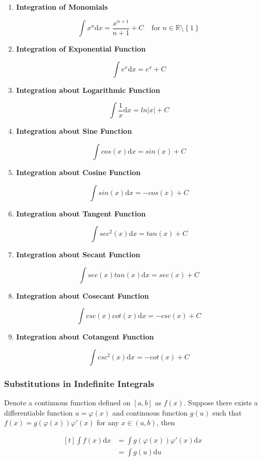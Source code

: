 \documentclass[a4paper,12pt]{article}
\newcommand{\R}{\mathbb{R}}
\newcommand{\diff}{\mathrm{d}}
\newenvironment{alist}{ %
\begin{enumerate}[label=(\alph*)]
}{
\end{enumerate}
}
\begin{document}
\begin{alist}
  \item \textbf{Integration of Monomials}

  $$\int x^{n}\diff x=\frac{x^{n+1}}{n+1}+C\;\;\;\;\text{for }n\in\R\setminus\left\{ 1\right\}$$

  \item \textbf{Integration of Exponential Function}

  $$\int e^{x}\diff x=e^{x}+C$$

  \item \textbf{Integration about Logarithmic Function}

  $$\int\frac{1}{x}\diff x=ln\left| x\right| +C$$

  \item \textbf{Integration about Sine Function}

  $$\int cos(x)\diff x=sin(x)+C$$

  \item \textbf{Integration about Cosine Function}

  $$\int sin(x)\diff x=-cos(x)+C$$

  \item \textbf{Integration about Tangent Function}

  $$\int sec^{2}(x)\diff x=tan(x)+C$$

  \item \textbf{Integration about Secant Function}

  $$\int sec(x)tan(x)\diff x=sec(x)+C$$

  \item \textbf{Integration about Cosecant Function}

  $$\int csc(x)cot(x)\diff x=-csc(x)+C$$

  \item \textbf{Integration about Cotangent Function}

  $$\int csc^{2}(x)\diff x=-cot(x)+C$$
\end{alist}

\subsubsection{Substitutions in Indefinite Integrals}
Denote a continuous function defined on $[a,b]$ as $f(x)$. Suppose there exists a differentiable function $u=\varphi(x)$ and continuous function $g(u)$ such that $f(x)=g(\varphi(x))\varphi'(x)$ for any $x\in(a,b)$, then

$$\begin{aligned}[t]
  \int f(x)\diff x&=\int g(\varphi(x))\varphi'(x)\diff x\\
  &=\int g(u)\diff u
\end{aligned}$$
\end{document}
